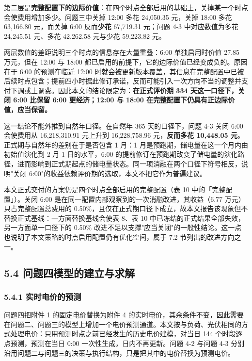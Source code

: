 \documentclass[12pt,a4paper]{ctexart}
\begin{document}
第二层是\textbf{完整配置下的边际价值}：在四个时点全部启用的基础上，关掉某一个时点会使费用增加多少。问题三中关掉 12:00 多花 24,050.35 元，关掉 18:00 多花 63,166.80 元，而关掉 6:00 反而\textbf{少花} 67,719.31 元；问题 4-3 中对应数值为多花 24,245.51 元、多花 42,262.58 元与少花 59,223.82 元。

两层数值的差距说明三个时点的信息存在大量重叠：6:00 单独启用时价值 27.85 万元，但在 12:00 与 18:00 都已启用的前提下，它的边际价值已经变成负的。原因在于 6:00 的预测在临近 12:00 时就会被更新版本覆盖，其信息在完整配置中已被后续时点包含；提前四小时据此修订承诺，反而可能引入一次方向不当的调整并支付下调或上调费。因此本文的结论限定为：\textbf{在正式评价期 334 天这一口径下，关闭 6:00 比保留 6:00 更经济；12:00 与 18:00 在完整配置下仍具有正边际价值，应当保留。}

这一结论不能外推到自然年口径。在自然年 365 天的口径下，问题 4-3 关闭 6:00 会使费用从 16,218,310.91 元上升到 16,228,758.96 元，\textbf{反而多花 10,448.05 元}。正式期与自然年的差别在于是否包含 1 月：1 月是预跑期，储电量在这一个月内由初始值演化到 2 月 1 日的水平，6:00 的提前修订在预跑期改变了储电量的演化路径，进而影响到正式期起点的储电量状态。同一项消融在两个口径下符号相反，说明"关闭 6:00"的收益依赖评价期的选取，本文不把它作为普遍建议。

本文正式交付的方案仍是四个时点全部启用的完整配置（表 10 中的「完整配置」）。关闭 6:00 是在同一配置内部观察到的一次消融改进，其收益（6.77 万元）只占完整配置总费用的 0.50\%，且仅在正式期口径下成立，故本文报告该现象但不替换正式基线：一方面替换基线会使表 8、表 10 中已冻结的正式结果全部失效，另一方面单一口径下的 0.50\% 改进不足以支撑"应当关闭"的一般性结论。这一点也说明了本文策略的时点启用配置仍有优化空间，属于 7.2 节列出的改进方向之一。

\subsection*{5.4 问题四模型的建立与求解}

\subsubsection*{5.4.1 实时电价的预测}

问题四把附件 1 的固定电价替换为附件 4 的实时电价，其余条件不变，因此需要在问题二、问题三的模型上增加一个电价预测通道。本文按与负荷、光伏相同的方式处理电价：只用预测时点之前已经发生的历史电价建模，对当日 144 个时段逐点预测，预测在当日 0:00 一次性生成，日内不再更新。问题 4-2 与问题 4-3 分别沿用问题二与问题三的决策与执行结构，只是把其中的电价替换为预测电价。
\end{document}
